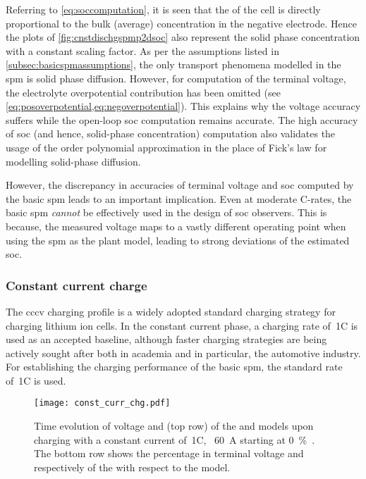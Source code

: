 Referring to \cref{eq:soccomputation}, it is  seen that the  of
the cell  is directly proportional  to the  bulk (average) concentration  in the
negative  electrode.  Hence  the  plots  of \cref{fig:cnstdischgspmp2dsoc}  also
represent the solid  phase concentration with a constant scaling  factor. As per
the assumptions listed  in \cref{subsec:basicspmassumptions}, the only transport
phenomena  modelled in  the \gls{spm}  is  solid phase  diffusion. However,  for
computation of the terminal  voltage, the electrolyte overpotential contribution
has  been   omitted  (see \cref{eq:posoverpotential,eq:negoverpotential}).  This
explains  why  the  voltage  accuracy  suffers  while  the  open-loop  \gls{soc}
computation  remains  accurate.  The  high accuracy  of  \gls{soc}  (and  hence,
solid-phase  concentration)   computation  also  validates  the   usage  of  the
 order polynomial  approximation in the place of  Fick's law for
modelling solid-phase diffusion.

However,  the  discrepancy  in  accuracies of  terminal  voltage  and  \gls{soc}
computed  by the  basic \gls{spm}  leads to  an important  implication. Even  at
moderate C-rates, the  basic \gls{spm} \emph{cannot} be effectively  used in the
design of \gls{soc}  observers. This is because, the measured  voltage maps to a
vastly different  operating point when using  the \gls{spm} as the  plant model,
leading to strong deviations of the estimated \gls{soc}.


\subsubsection*{Constant current charge}\label{subsubsec:cnstcurrchgsim}

The \gls{cccv} charging  profile is a widely adopted  standard charging strategy
for charging lithium  ion cells. In the constant current  phase, a charging rate
of~1C is  used as an accepted baseline, although  faster charging strategies are
being actively sought  after both in academia and in  particular, the automotive
industry. For establishing the charging performance of the basic \gls{spm}, the
standard rate of~1C is used.

\begin{figure}[!htbp]
    \centering
    \texttt{[image: const\_curr\_chg.pdf]}
    \caption[Voltage and  computed by  and
     for 1C~constant current charge]{Time evolution of voltage
        and  (top row) of the  and
         models upon charging with a constant current of~1C,
        \ie~\SI{60}{\ampere} starting at \SI{0}{\percent}~.
        The bottom row shows the percentage in terminal voltage and
         respectively of the  with respect to
    the  model.}
    \label{fig:cnstchgspmp2d}
\end{figure}

